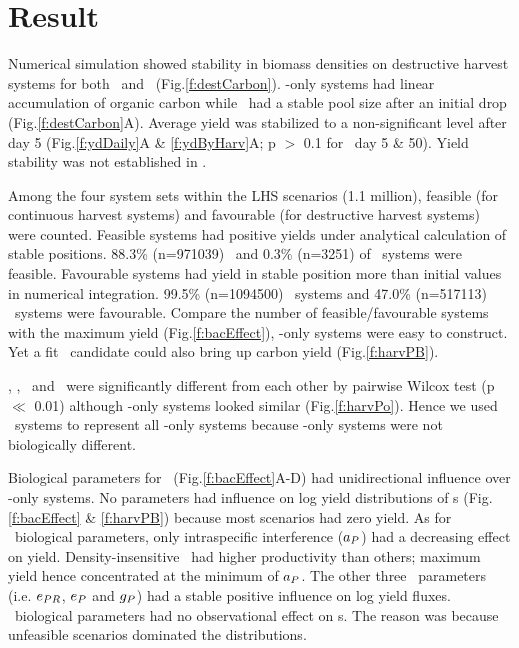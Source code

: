 \documentclass[../thesis.tex]{subfiles} %
\begin{document}
\section{Result}
Numerical simulation showed stability in biomass densities on destructive harvest systems for both \PoN\ and \PBN\ (Fig.\ref{f:destCarbon}).  \Phy-only systems had linear accumulation of organic carbon while \pbs\ had a stable pool size after an initial drop (Fig.\ref{f:destCarbon}A).  Average yield was stabilized to a non-significant level after day 5 (Fig.\ref{f:ydDaily}A \& \ref{f:ydByHarv}A; p $>$ 0.1 for \PoN\ day 5 \& 50).  Yield stability was not established in \pbs.

Among the four system sets within the LHS scenarios (1.1 million), feasible (for continuous harvest systems) and favourable (for destructive harvest systems) were counted.  Feasible systems had positive yields under analytical calculation of stable positions.  88.3\% (n=971039) \PoH\ and 0.3\% (n=3251) of \PBH\ systems were feasible.  Favourable systems had yield in stable position more than initial values in numerical integration.  99.5\% (n=1094500) \PoN\ systems and 47.0\% (n=517113) \PBN\ systems were favourable.  Compare the number of feasible/favourable systems with the maximum yield (Fig.\ref{f:bacEffect}), \phy-only systems were easy to construct.  Yet a fit \bac\ candidate could also bring up carbon yield (Fig.\ref{f:harvPB}).

\PBH, \PoH, \PBN\ and \PoN\ were significantly different from each other by pairwise Wilcox test (p $\ll$ 0.01) although \phy-only systems looked similar (Fig.\ref{f:harvPo}).  Hence we used \PoN\ systems to represent all \phy-only systems because \phy-only systems were not biologically different.

Biological parameters for \phy\ (Fig.\ref{f:bacEffect}A-D) had unidirectional influence over \phy-only systems.  No parameters had influence on log yield distributions of \pbs s (Fig.\ref{f:bacEffect} \& \ref{f:harvPB}) because most scenarios had zero yield.   As for \phy\ biological parameters, only intraspecific interference ($a_P$) had a decreasing effect on yield.  Density-insensitive \phy\ had higher productivity than others; maximum yield hence concentrated at the minimum of $a_P$.  The other three \phy\ parameters (i.e. $e_{PR}$, $e_P$ and $g_P$) had a stable positive influence on log yield fluxes.  \Phy\ biological parameters had no observational effect on \pbs s.  The reason was because unfeasible scenarios dominated the distributions.
\end{document}
